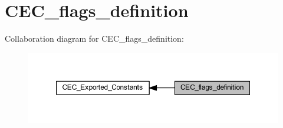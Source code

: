 \hypertarget{group___c_e_c__flags__definition}{}\section{C\+E\+C\+\_\+flags\+\_\+definition}
\label{group___c_e_c__flags__definition}
Collaboration diagram for C\+E\+C\+\_\+flags\+\_\+definition\+:
\nopagebreak
\begin{figure}[H]
\begin{center}
\leavevmode
\includegraphics[width=350pt]{group___c_e_c__flags__definition}
\end{center}
\end{figure}
